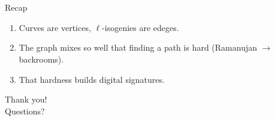 \documentclass[10pt,aspectratio=169]{beamer}
\begin{document}
\section*{}

\begin{frame}{Recap}
  \begin{enumerate}
    \item Curves are \alert{vertices}, $\ell$-isogenies are \alert{edeges}.
    \item The graph mixes so well that \alert{finding a path is hard} (Ramanujan $\to$ backrooms).
    \item That hardness \alert{builds digital signatures}.
  \end{enumerate}
  \vspace{0.8em}
\end{frame}

\begin{frame}[plain]
  \centering
  \vfill
  {\Huge Thank you!}\\[0.6em]
  \large Questions?
  \vfill
\end{frame}



\end{document}
